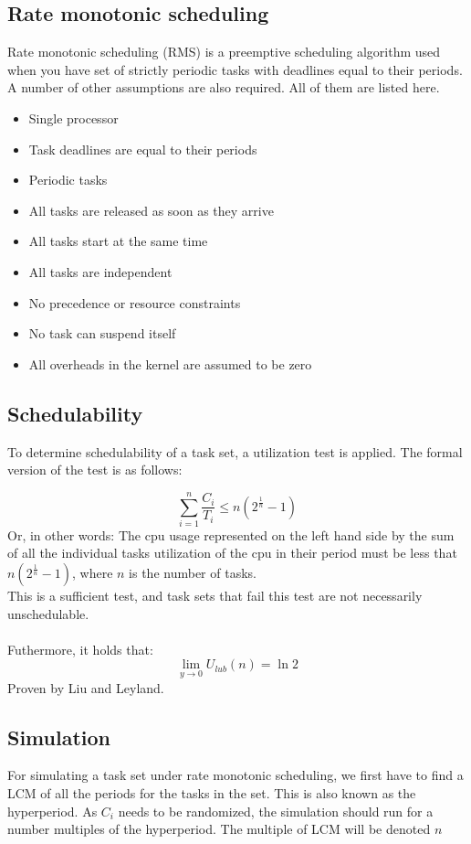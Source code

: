 \subsection{Rate monotonic scheduling}
Rate monotonic scheduling (RMS) is a preemptive scheduling algorithm used when you have set of strictly periodic tasks with deadlines equal to their periods. A number of other assumptions are also required. All of them are listed here.
\begin{itemize}
\item Single processor
\item Task deadlines are equal to their periods
\item Periodic tasks
\item All tasks are released as soon as they arrive
\item All tasks start at the same time
\item All tasks are independent
\item No precedence or resource constraints
\item No task can suspend itself
\item All overheads in the kernel are assumed to be zero
\end{itemize}

\subsection{Schedulability}
To determine schedulability of a task set, a utilization test is applied. The formal version of the test is as follows:

\begin{equation}
\displaystyle\sum\limits_{i=1}^{n} \frac{C_i}{T_i} \leq n \left( 2^{\frac{1}{n}} - 1 \right) 
\end{equation}
Or, in other words: The cpu usage represented on the left hand side by the sum of all the individual tasks utilization of the cpu in their period must be less that $n \left( 2^{\frac{1}{n}} - 1 \right) $, where $n$ is the number of tasks.\\
This is a sufficient test, and task sets that fail this test are not necessarily unschedulable.\\\\
Futhermore, it holds that:
\begin{equation}
\underset{y\rightarrow0}{\lim}U_{lub}(n)=\ln2
\end{equation}
Proven by Liu and Leyland.

\subsection{Simulation}
For simulating a task set under rate monotonic scheduling, we first have to find a LCM of all the periods for the tasks in the set. This is also known as the hyperperiod. As $C_i$ needs to be randomized, the simulation should run for a number multiples of the hyperperiod. The multiple of LCM will be denoted $n$

